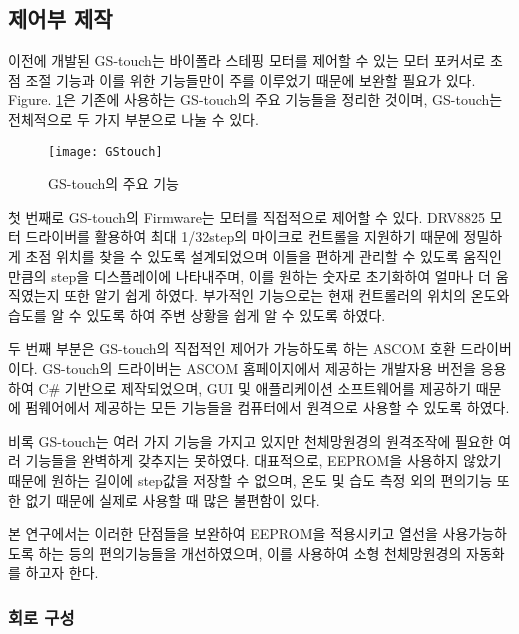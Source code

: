 \newpage
\subsection{제어부 제작}

이전에 개발된 GS-touch는 바이폴라 스테핑 모터를 제어할 수 있는 모터 포커서로 초점 조절 기능과 이를 위한 기능들만이 주를 이루었기 때문에 보완할 필요가 있다. \textrm{Figure}. \ref{GStocuh}은 기존에 사용하는 GS-touch의 주요 기능들을 정리한 것이며, GS-touch는 전체적으로 두 가지 부분으로 나눌 수 있다.

\bigskip
\begin{figure}[h]
	\begin{center}
		\texttt{[image: GStouch]}
	\end{center}
	\caption{GS-touch의 주요 기능}
	\label{GStocuh}
\end{figure}

첫 번째로 GS-touch의 Firmware는 모터를 직접적으로 제어할 수 있다. DRV8825 모터 드라이버를 활용하여 최대 1/32step의 마이크로 컨트롤을 지원하기 때문에 정밀하게 초점 위치를 찾을 수 있도록 설계되었으며 이들을 편하게 관리할 수 있도록 움직인 만큼의 step을 디스플레이에 나타내주며, 이를 원하는 숫자로 초기화하여 얼마나 더 움직였는지 또한 알기 쉽게 하였다. 부가적인 기능으로는 현재 컨트롤러의 위치의 온도와 습도를 알 수 있도록 하여 주변 상황을 쉽게 알 수 있도록 하였다.

두 번째 부분은 GS-touch의 직접적인 제어가 가능하도록 하는 ASCOM 호환 드라이버이다. GS-touch의 드라이버는 ASCOM 홈페이지에서 제공하는 개발자용 버전을 응용하여 C\# 기반으로 제작되었으며, GUI 및 애플리케이션 소프트웨어를 제공하기 때문에 펌웨어에서 제공하는 모든 기능들을 컴퓨터에서 원격으로 사용할 수 있도록 하였다.

비록 GS-touch는 여러 가지 기능을 가지고 있지만 천체망원경의 원격조작에 필요한 여러 기능들을 완벽하게 갖추지는 못하였다. 대표적으로, EEPROM을 사용하지 않았기 때문에 원하는 길이에 step값을 저장할 수 없으며, 온도 및 습도 측정 외의 편의기능 또한 없기 때문에 실제로 사용할 때 많은 불편함이 있다. 

본 연구에서는 이러한 단점들을 보완하여 EEPROM을 적용시키고 열선을 사용가능하도록 하는 등의 편의기능들을 개선하였으며, 이를 사용하여 소형 천체망원경의 자동화를 하고자 한다.

\subsubsection{회로 구성}


